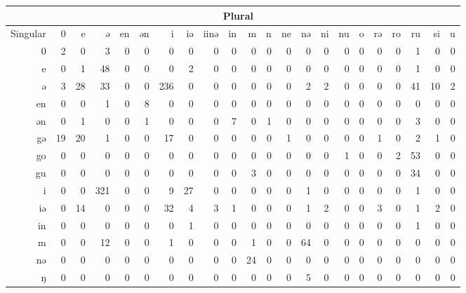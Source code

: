\begin{table}
    \centering
    \small
    \begin{tabular}{rrrrrrrrrrrrrrrrrrrrrr}
      \lsptoprule
      & \multicolumn{19}{c}{Plural}\\
      \midrule
      Singular & 0  & e  & ə   & en & ən & i   & iə & iinə & in & m  & n & ne & nə & ni & nu & o & rə & ro & ru & si & u   \\
      \midrule
      0  & 2  & 0  & 3   & 0  & 0  & 0   & 0  & 0    & 0  & 0  & 0 & 0  & 0  & 0  & 0  & 0 & 0  & 0  & 1  & 0  & 0   \\
      e  & 0  & 1  & 48  & 0  & 0  & 0   & 2  & 0    & 0  & 0  & 0 & 0  & 0  & 0  & 0  & 0 & 0  & 0  & 1  & 0  & 0   \\
      ə  & 3  & 28 & 33  & 0  & 0  & 236 & 0  & 0    & 0  & 0  & 0 & 0  & 2  & 2  & 0  & 0 & 0  & 0  & 41 & 10 & 2   \\
      en & 0  & 0  & 1   & 0  & 8  & 0   & 0  & 0    & 0  & 0  & 0 & 0  & 0  & 0  & 0  & 0 & 0  & 0  & 0  & 0  & 0   \\
      ən & 0  & 1  & 0   & 0  & 1  & 0   & 0  & 0    & 7  & 0  & 1 & 0  & 0  & 0  & 0  & 0 & 0  & 0  & 3  & 0  & 0   \\
      gə & 19 & 20 & 1   & 0  & 0  & 17  & 0  & 0    & 0  & 0  & 0 & 1  & 0  & 0  & 0  & 0 & 1  & 0  & 2  & 1  & 0   \\
      go & 0  & 0  & 0   & 0  & 0  & 0   & 0  & 0    & 0  & 0  & 0 & 0  & 0  & 0  & 1  & 0 & 0  & 2  & 53 & 0  & 0   \\
      gu & 0  & 0  & 0   & 0  & 0  & 0   & 0  & 0    & 0  & 3  & 0 & 0  & 0  & 0  & 0  & 0 & 0  & 0  & 34 & 0  & 0   \\
      i  & 0  & 0  & 321 & 0  & 0  & 9   & 27 & 0    & 0  & 0  & 0 & 0  & 1  & 0  & 0  & 0 & 0  & 0  & 1  & 0  & 0   \\
      iə & 0  & 14 & 0   & 0  & 0  & 32  & 4  & 3    & 1  & 0  & 0 & 0  & 1  & 2  & 0  & 0 & 3  & 0  & 1  & 2  & 0   \\
      in & 0  & 0  & 0   & 0  & 0  & 0   & 1  & 0    & 0  & 0  & 0 & 0  & 0  & 0  & 0  & 0 & 0  & 0  & 1  & 0  & 0   \\
      m  & 0  & 0  & 12  & 0  & 0  & 1   & 0  & 0    & 0  & 1  & 0 & 0  & 64 & 0  & 0  & 0 & 0  & 0  & 0  & 0  & 0   \\
      nə & 0  & 0  & 0   & 0  & 0  & 0   & 0  & 0    & 0  & 24 & 0 & 0  & 0  & 0  & 0  & 0 & 0  & 0  & 0  & 0  & 0   \\
      ŋ  & 0  & 0  & 0   & 0  & 0  & 0   & 0  & 0    & 0  & 0  & 0 & 0  & 5  & 0  & 0  & 0 & 0  & 0  & 0  & 0  & 0   \\

\end{tabular}
\end{table}

